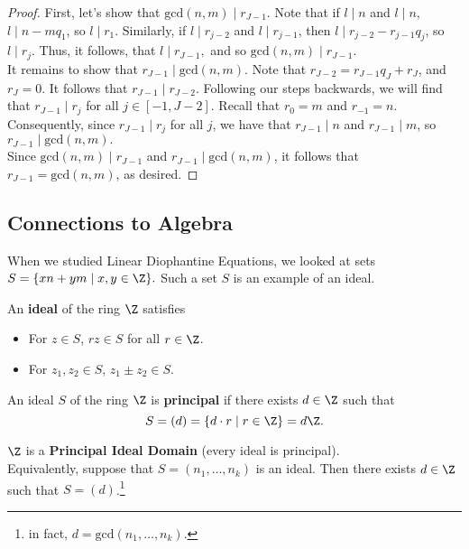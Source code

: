 \documentclass[11pt]{article}
\begin{document}
\begin{proof}
First, let's show that $\mathrm{gcd}(n, m) \mid r_{J-1}.$ Note that if $l \mid n$ and $l \mid n$, $l \mid n - mq_1$, so $l \mid r_1$. Similarly, if 
$l \mid r_{j-2}$ and $l \mid r_{j-1}$, then $l \mid r_{j-2} - r_{j-1}q_j$, so $l \mid r_j$. Thus, it follows, that $l \mid r_{J-1},$ and so $\mathrm{gcd}(n, m) \mid r_{J-1}.$ \\

It remains to show that $r_{J-1} \mid \mathrm{gcd}(n, m)$. Note that
$r_{J-2} = r_{J-1}q_{J} + r_J$, and $r_J = 0$. It follows that $r_{J-1} \mid r_{J-2}$. Following our steps backwards, 
we will find that $r_{J-1} \mid r_j$ for all $j \in [-1, J-2].$ 
Recall that $r_0 = m$ and $r_{-1} = n$. Consequently, since $r_{J-1} \mid r_j$ for all $j$, we have that $r_{J-1} \mid n$ and $r_{J-1} \mid m$, so $r_{J-1} \mid \mathrm{gcd}(n, m).$ \\

Since $\mathrm{gcd}(n, m) \mid r_{J-1}$ and $r_{J-1} \mid \mathrm{gcd}(n, m)$, it follows that $r_{J-1} = \mathrm{gcd}(n, m)$, as desired. 
\end{proof}

\subsection{Connections to Algebra}
When we studied Linear Diophantine Equations, we looked at sets $S = \{ xn + ym \mid x, y \in \Z \}.$ Such a set $S$ is an example of an ideal.
\begin{definition}[Ideals]
An \textbf{ideal} of the ring $\Z$ satisfies
\begin{itemize}
    \item For $z \in S$, $rz \in S$ for all $r \in \Z$.
    \item For $z_1, z_2 \in S$, $z_1 \pm z_2 \in S$.
\end{itemize}
\end{definition} 

\begin{definition}
An ideal $S$ of the ring $\Z$ is \textbf{principal} if there exists $d \in \Z$ such that
\[ S = (d) = \{ d \cdot r \mid r \in \Z \} = d\Z. \]     
\end{definition}

\begin{theorem}
$\Z$ is a \textbf{Principal Ideal Domain} (every ideal is principal). \\

Equivalently, suppose that $S = (n_1, \dots, n_k)$ is an ideal. Then there exists $d \in \Z$ such that $S = (d)$.\footnote{in fact, $d = \mathrm{gcd}(n_1, \dots, n_k)$. }
\end{theorem}
\end{document}
